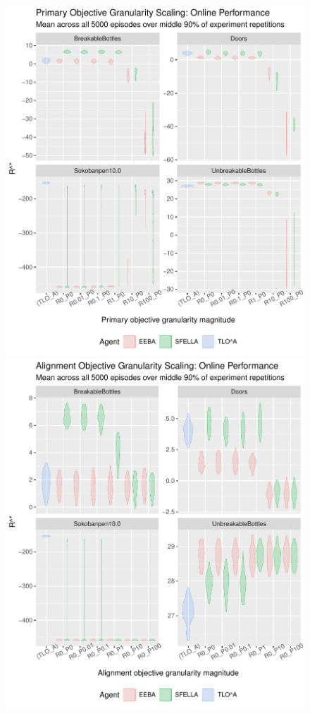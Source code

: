 \begin{figure}
  \includegraphics[width=\columnwidth]{output/multirun_n100_pilot_granularity_tunedonline_RewGranularity.pdf}
  \includegraphics[width=\columnwidth]{output/multirun_n100_pilot_granularity_tunedonline_PenGranularity.pdf}

\end{figure}
